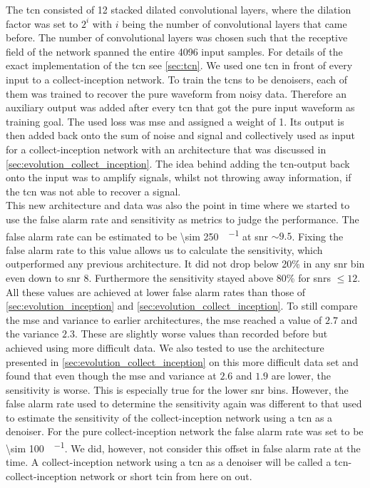 The \gls{tcn} consisted of 12 stacked dilated convolutional layers, where the dilation factor was set to $2^i$ with $i$ being the number of convolutional layers that came before. The number of convolutional layers was chosen such that the receptive field of the network spanned the entire 4096 input samples. For details of the exact implementation of the \gls{tcn} see \autoref{sec:tcn}. We used one \gls{tcn} in front of every input to a collect-inception network. To train the \gls{tcn}s to be denoisers, each of them was trained to recover the pure waveform from noisy data. Therefore an auxiliary output was added after every \gls{tcn} that got the pure input waveform as training goal. The used loss was \gls{mse} and assigned a weight of 1. Its output is then added back onto the sum of noise and signal and collectively used as input for a collect-inception network with an architecture that was discussed in \autoref{sec:evolution_collect_inception}. The idea behind adding the \gls{tcn}-output back onto the input was to amplify signals, whilst not throwing away information, if the \gls{tcn} was not able to recover a signal.\\
This new architecture and data was also the point in time where we started to use the false alarm rate and sensitivity as metrics to judge the performance. The false alarm rate can be estimated to be \SI[per-mode=fraction]{\sim 250}{\samples\per\month} at \gls{snr} $\sim 9.5$. Fixing the false alarm rate to this value allows us to calculate the sensitivity, which outperformed any previous architecture. It did not drop below 20\% in any \gls{snr} bin even down to \gls{snr} 8. Furthermore the sensitivity stayed above 80\% for \gls{snr}s $\leq 12$. All these values are achieved at lower false alarm rates than those of \autoref{sec:evolution_inception} and \autoref{sec:evolution_collect_inception}. To still compare the \gls{mse} and variance to earlier architectures, the \gls{mse} reached a value of $2.7$ and the variance $2.3$. These are slightly worse values than recorded before but achieved using more difficult data. We also tested to use the architecture presented in \autoref{sec:evolution_collect_inception} on this more difficult data set and found that even though the \gls{mse} and variance at $2.6$ and $1.9$ are lower, the sensitivity is worse. This is especially true for the lower \gls{snr} bins. However, the false alarm rate used to determine the sensitivity again was different to that used to estimate the sensitivity of the collect-inception network using a \gls{tcn} as a denoiser. For the pure collect-inception network the false alarm rate was set to be \SI[per-mode=fraction]{\sim 100}{\samples\per\month}. We did, however, not consider this offset in false alarm rate at the time. A collect-inception network using a \gls{tcn} as a denoiser will be called a \gls{tcn}-collect-inception network or short \gls{tcin} from here on out.\\
